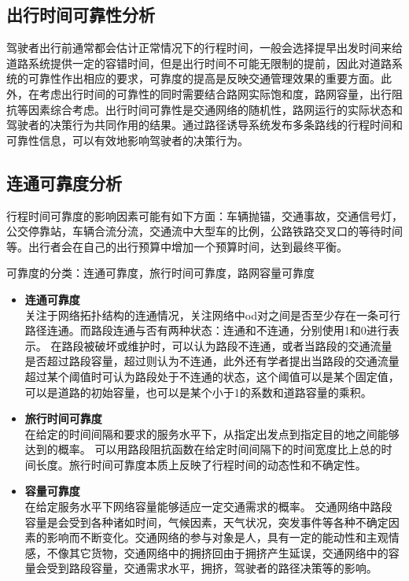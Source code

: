 \subsection{出行时间可靠性分析}\label{subsec:出行时间可靠性分析}
驾驶者出行前通常都会估计正常情况下的行程时间，一般会选择提早出发时间来给道路系统提供一定的容错时间，但是出行时间不可能无限制的提前，因此对道路系统的可靠性作出相应的要求，可靠度的提高是反映交通管理效果的重要方面。此外，在考虑出行时间的可靠性的同时需要结合路网实际饱和度，路网容量，出行阻抗等因素综合考虑。出行时间可靠性是交通网络的随机性，路网运行的实际状态和驾驶者的决策行为共同作用的结果。通过路径诱导系统发布多条路线的行程时间和可靠性信息，可以有效地影响驾驶者的决策行为。

\subsection{连通可靠度分析}\label{subsec:连通可靠度分析}
行程时间可靠度的影响因素可能有如下方面：车辆抛锚，交通事故，交通信号灯，公交停靠站，车辆合流分流，交通流中大型车的比例，公路铁路交叉口的等待时间等。出行者会在自己的出行预算中增加一个预算时间，达到最终平衡。

可靠度的分类：连通可靠度，旅行时间可靠度，路网容量可靠度
\begin{itemize}%
    \item \textbf{连通可靠度}\\
    关注于网络拓扑结构的连通情况，关注网络中od对之间是否至少存在一条可行路径连通。而路段连通与否有两种状态：连通和不连通，分别使用1和0进行表示。
    在路段被破坏或维护时，可以认为路段不连通，或者当路段的交通流量是否超过路段容量，超过则认为不连通，此外还有学者提出当路段的交通流量超过某个阈值时可认为路段处于不连通的状态，这个阈值可以是某个固定值，可以是道路的初始容量，也可以是某个小于1的系数和道路容量的乘积。

    \item \textbf{旅行时间可靠度}\\
    在给定的时间间隔和要求的服务水平下，从指定出发点到指定目的地之间能够达到的概率。 可以用路段阻抗函数在给定时间间隔下的时间宽度比上总的时间长度。旅行时间可靠度本质上反映了行程时间的动态性和不确定性。

    \item \textbf{容量可靠度}\\
    在给定服务水平下网络容量能够适应一定交通需求的概率。
    交通网络中路段容量是会受到各种诸如时间，气候因素，天气状况，突发事件等各种不确定因素的影响而不断变化。交通网络的参与对象是人，具有一定的能动性和主观情感，不像其它货物，交通网络中的拥挤回由于拥挤产生延误，交通网络中的容量会受到路段容量，交通需求水平，拥挤，驾驶者的路径决策等的影响。
\end{itemize}


